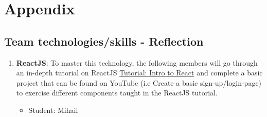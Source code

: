 \documentclass{article}
\begin{document}


\newpage



\newpage

\section{Appendix}

\subsection{Team technologies/skills - Reflection  }
\begin{enumerate}
    \item \textbf{ReactJS}: To master this technology, the following members will go through an in-depth tutorial on ReactJS \href{https://reactjs.org/tutorial/tutorial.html}{Tutorial: Intro to React} and complete a basic project that can be found on YouTube (i.e Create a basic sign-up/login-page) to exercise different components taught in the ReactJS tutorial.
        \begin{itemize}
            \item Student: Mihail
        \end{itemize}
    

\end{enumerate}
\end{document}
